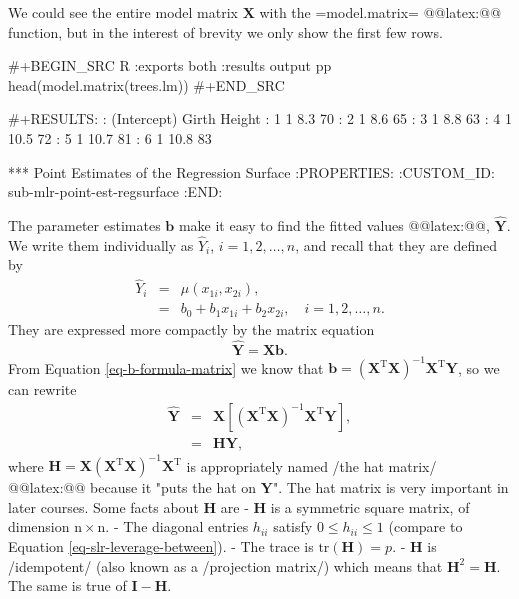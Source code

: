 We could see the entire model matrix \(\mathbf{X}\) with the
=model.matrix= @@latex:@@
function, but in the interest of brevity we only show the first few
rows.

#+BEGIN_SRC R :exports both :results output pp 
head(model.matrix(trees.lm))
#+END_SRC

#+RESULTS:
:   (Intercept) Girth Height
: 1           1   8.3     70
: 2           1   8.6     65
: 3           1   8.8     63
: 4           1  10.5     72
: 5           1  10.7     81
: 6           1  10.8     83

*** Point Estimates of the Regression Surface
:PROPERTIES:
:CUSTOM_ID: sub-mlr-point-est-regsurface
:END:

The parameter estimates \(\mathbf{b}\) make it easy to find the fitted
values @@latex:@@, \(\hat{\mathbf{Y}}\). We write them
individually as \(\hat{Y}_{i}\), \(i=1,2,\ldots,n\), and recall that
they are defined by
\begin{eqnarray}
\hat{Y}_{i} & = & \hat{\mu}(x_{1i},x_{2i}),\\
 & = & b_{0}+b_{1}x_{1i}+b_{2}x_{2i},\quad i=1,2,\ldots,n.
\end{eqnarray}
They are expressed more compactly by the matrix equation
\begin{equation}
\hat{\mathbf{Y}}=\mathbf{X}\mathbf{b}.
\end{equation}
From Equation \eqref{eq-b-formula-matrix} we know that
\(\mathbf{b}=\left(\mathbf{X}^{\mathrm{T}}\mathbf{X}\right)^{-1}\mathbf{X}^{\mathrm{T}}\mathbf{Y}\),
so we can rewrite
\begin{eqnarray}
\hat{\mathbf{Y}} & = & \mathbf{X}\left[\left(\mathbf{X}^{\mathrm{T}}\mathbf{X}\right)^{-1}\mathbf{X}^{\mathrm{T}}\mathbf{Y}\right],\\
 & = & \mathbf{H}\mathbf{Y},
\end{eqnarray}
where
\(\mathbf{H}=\mathbf{X}\left(\mathbf{X}^{\mathrm{T}}\mathbf{X}\right)^{-1}\mathbf{X}^{\mathrm{T}}\)
is appropriately named /the hat matrix/ @@latex:@@ because it
"puts the hat on \(\mathbf{Y}\)". The hat matrix is very important in
later courses. Some facts about \(\mathbf{H}\) are
- \(\mathbf{H}\) is a symmetric square matrix, of dimension
  \(\mathrm{n}\times\mathrm{n}\).
- The diagonal entries \(h_{ii}\) satisfy \(0\leq h_{ii}\leq1\)
  (compare to Equation \eqref{eq-slr-leverage-between}).
- The trace is \(\mathrm{tr}(\mathbf{H})=p\).
- \(\mathbf{H}\) is /idempotent/ (also known as a /projection matrix/)
  which means that \(\mathbf{H}^{2}=\mathbf{H}\). The same is true of
  \(\mathbf{I}-\mathbf{H}\).


